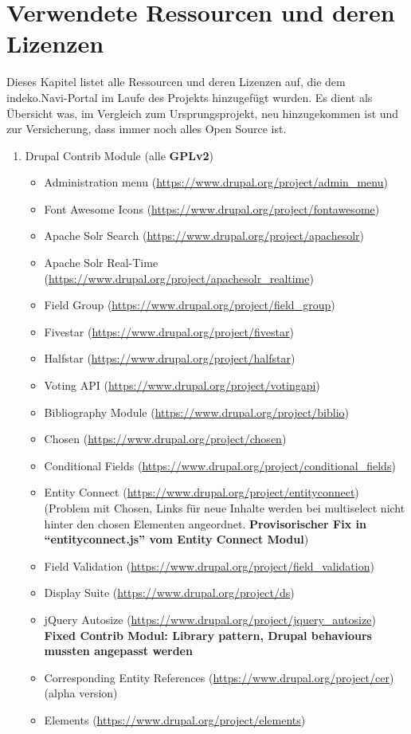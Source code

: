 \section{Verwendete Ressourcen und deren Lizenzen}\label{sub:license}
Dieses Kapitel listet alle Ressourcen und deren Lizenzen auf, die dem \acrshort{indeko}.Navi-Portal im Laufe des Projekts hinzugefügt wurden. Es dient als Übersicht was, im Vergleich zum Ursprungsprojekt, neu hinzugekommen ist und zur Versicherung, dass immer noch alles Open Source ist.

\begin{enumerate}
	\item Drupal Contrib Module (alle \textbf{GPLv2})
	\begin{itemize}
		\item Administration menu (\url{https://www.drupal.org/project/admin_menu})
		\item Font Awesome Icons (\url{https://www.drupal.org/project/fontawesome})
		\item Apache Solr Search (\url{https://www.drupal.org/project/apachesolr})
		\item Apache Solr Real-Time (\url{https://www.drupal.org/project/apachesolr_realtime})
		\item Field Group (\url{https://www.drupal.org/project/field_group})
		\item Fivestar (\url{https://www.drupal.org/project/fivestar})
		\item Halfstar (\url{https://www.drupal.org/project/halfstar})
		\item Voting API (\url{https://www.drupal.org/project/votingapi})
		\item Bibliography Module (\url{https://www.drupal.org/project/biblio})
		\item Chosen (\url{https://www.drupal.org/project/chosen})
		\item Conditional Fields (\url{https://www.drupal.org/project/conditional_fields})
		\item Entity Connect (\url{https://www.drupal.org/project/entityconnect}) (Problem mit Chosen, Links für neue Inhalte werden bei multiselect nicht hinter den chosen Elementen angeordnet. \textbf{Provisorischer Fix in \enquote{entityconnect.js} vom Entity Connect Modul})
		\item Field Validation (\url{https://www.drupal.org/project/field_validation})
		\item Display Suite (\url{https://www.drupal.org/project/ds})
		\item jQuery Autosize (\url{https://www.drupal.org/project/jquery_autosize}) \textbf{Fixed Contrib Modul: Library pattern, Drupal behaviours mussten angepasst werden}
		\item Corresponding Entity References (\url{https://www.drupal.org/project/cer}) (alpha version)  
		\item Elements (\url{https://www.drupal.org/project/elements})
	\end{itemize}


\end{enumerate}
